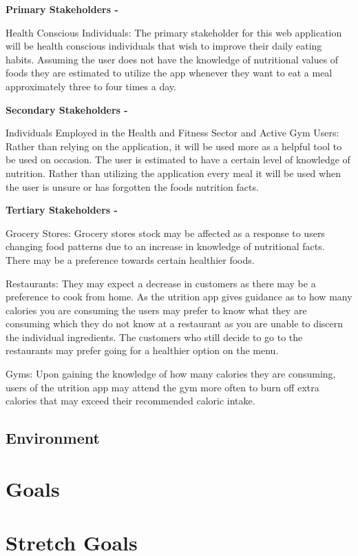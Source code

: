 \documentclass{article}
\begin{document}
\textbf{Primary Stakeholders - } 

Health Conscious Individuals: The primary stakeholder for this web application will be health conscious individuals that wish to improve their daily eating habits. Assuming the user does not have the knowledge of nutritional values of foods they are estimated to utilize the app whenever they want to eat a meal approximately three to four times a day.

\textbf{Secondary Stakeholders - } 

Individuals Employed in the Health and Fitness Sector and Active Gym Users: Rather than relying on the application, it will be used more as a helpful tool to be used on occasion. The user is estimated to have a certain level of knowledge of nutrition. Rather than utilizing the application every meal it will be used when the user is unsure or has forgotten the foods nutrition facts.

\textbf{Tertiary Stakeholders - } 

Grocery Stores: Grocery stores stock may be affected as a response to users changing food patterns due to an increase in knowledge of nutritional facts. There may be a preference towards certain healthier foods.

Restaurants: They may expect a decrease in customers as there may be a preference to cook from home. As the utrition app gives guidance as to how many calories you are consuming the users may prefer to know what they are consuming which they do not know at a restaurant as you are unable to discern the individual ingredients. The customers who still decide to go to the restaurants may prefer going for a healthier option on the menu.

Gyms: Upon gaining the knowledge of how many calories they are consuming, users of the utrition app may attend the gym more often to burn off extra calories that may exceed their recommended caloric intake. 


\subsection{Environment}


\section{Goals}

\section{Stretch Goals}
\end{document}
